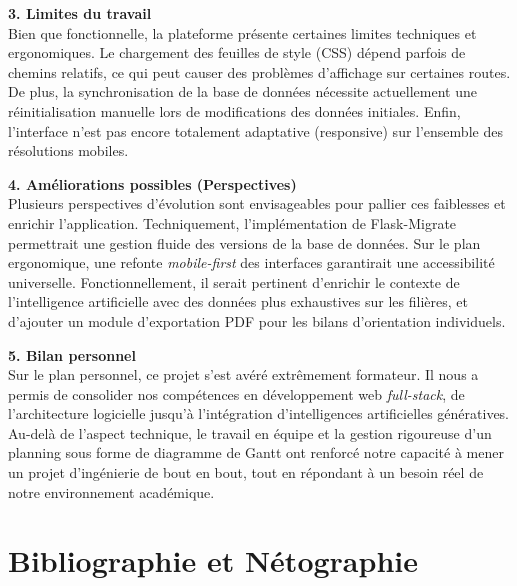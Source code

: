 \documentclass[a4paper,12pt]{article}
\begin{document}
\vspace{0.5cm}
\textbf{3. Limites du travail} \\
Bien que fonctionnelle, la plateforme présente certaines limites techniques et ergonomiques. Le chargement des feuilles de style (CSS) dépend parfois de chemins relatifs, ce qui peut causer des problèmes d'affichage sur certaines routes. De plus, la synchronisation de la base de données nécessite actuellement une réinitialisation manuelle lors de modifications des données initiales. Enfin, l'interface n'est pas encore totalement adaptative (responsive) sur l'ensemble des résolutions mobiles.

\vspace{0.5cm}
\textbf{4. Améliorations possibles (Perspectives)} \\
Plusieurs perspectives d'évolution sont envisageables pour pallier ces faiblesses et enrichir l'application. Techniquement, l'implémentation de Flask-Migrate permettrait une gestion fluide des versions de la base de données. Sur le plan ergonomique, une refonte \textit{mobile-first} des interfaces garantirait une accessibilité universelle. Fonctionnellement, il serait pertinent d'enrichir le contexte de l'intelligence artificielle avec des données plus exhaustives sur les filières, et d'ajouter un module d'exportation PDF pour les bilans d'orientation individuels.

\vspace{0.5cm}
\textbf{5. Bilan personnel} \\
Sur le plan personnel, ce projet s'est avéré extrêmement formateur. Il nous a permis de consolider nos compétences en développement web \textit{full-stack}, de l'architecture logicielle jusqu'à l'intégration d'intelligences artificielles génératives. Au-delà de l'aspect technique, le travail en équipe et la gestion rigoureuse d'un planning sous forme de diagramme de Gantt ont renforcé notre capacité à mener un projet d'ingénierie de bout en bout, tout en répondant à un besoin réel de notre environnement académique.

\clearpage
{}
\section*{Bibliographie et Nétographie}
\end{document}
